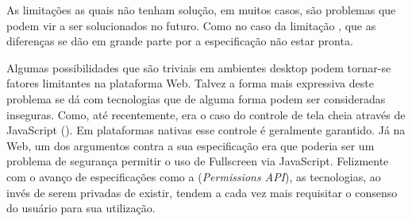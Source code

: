 As limitações as quais não tenham solução, em muitos casos, são
problemas que podem vir a ser solucionados no futuro. Como no
caso da limitação , que as diferenças
se dão em grande parte por a especificação não estar pronta.

Algumas possibilidades que são triviais em ambientes desktop podem
tornar-se fatores limitantes na plataforma Web. Talvez a forma mais
expressiva deste problema se dá com tecnologias que de alguma forma
podem ser consideradas inseguras. Como, até recentemente, era o caso
do controle de tela cheia através de JavaScript (). Em plataformas nativas esse
controle é geralmente garantido. Já na Web, um dos argumentos contra
a sua especificação era que poderia ser um problema de segurança
permitir o uso de Fullscreen via JavaScript. Felizmente com o avanço de
especificações como a (\textit{Permissions API}), as tecnologias, ao
invés de serem privadas de existir, tendem a cada vez mais requisitar o
consenso do usuário para sua utilização.
